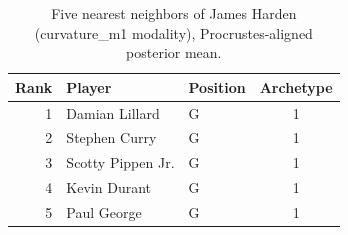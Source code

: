 \begin{table}[htbp]
  \centering\small
  \begin{tabular}{rllc}
    \toprule
    Rank & Player & Position & Archetype \\
    \midrule
    1 & Damian Lillard & G & 1 \\
    2 & Stephen Curry & G & 1 \\
    3 & Scotty Pippen Jr. & G & 1 \\
    4 & Kevin Durant & G & 1 \\
    5 & Paul George & G & 1 \\
    \bottomrule
  \end{tabular}
  \caption{Five nearest neighbors of James Harden (curvature_m1 modality), Procrustes-aligned posterior mean.}
  \label{tab:James_Harden_neighbors_curvature_m1}
\end{table}

